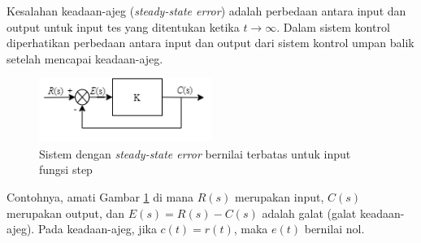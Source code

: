 Kesalahan keadaan-ajeg (\textit{steady-state error}) adalah perbedaan antara input dan output untuk input tes yang ditentukan ketika $t \rightarrow \infty$. Dalam sistem kontrol diperhatikan perbedaan antara input dan output dari sistem kontrol umpan balik setelah mencapai keadaan-ajeg. \cite{ControlSystemBook}


\begin{figure}[!h]
	\centering
	\includegraphics[width=0.5\textwidth]{figures/SSEExample}
	\caption{Sistem dengan \textit{steady-state error} bernilai terbatas untuk input fungsi step \cite{ControlSystemBook}}
	\label{fig:3:steadystateerror}
\end{figure}

Contohnya, amati Gambar \ref{fig:3:steadystateerror} di mana $R(s)$ merupakan input, $C(s)$ merupakan output, dan $E(s) = R(s) - C(s)$ adalah galat (galat keadaan-ajeg). Pada keadaan-ajeg, jika $c(t) = r(t)$, maka $e(t)$ bernilai nol.




